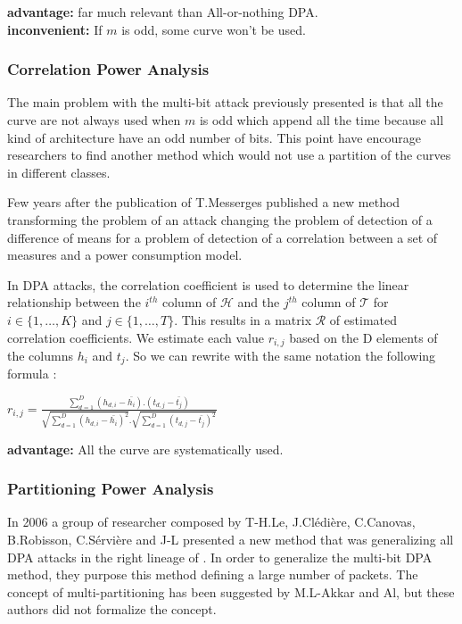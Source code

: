 \textbf{advantage:} far much relevant than All-or-nothing DPA.\\
\textbf{inconvenient:} If $m$ is odd, some curve won't be used.



\subsubsection{Correlation Power Analysis}
 The main problem with the multi-bit attack previously presented is that all the
curve are not always used when  $m$ is odd which append all the time because all kind of
architecture have an odd number of bits. This point have encourage researchers to find another 
method which would not use a partition of the curves in different classes.

Few years after the publication of  T.Messerges \cite{phd-Messerges-2000} 
published a new method transforming the problem of an attack changing
the problem of detection of a difference of means for a problem of detection 
of a correlation between a set of measures and  a power consumption model.


In DPA attacks, the correlation coefficient is used to determine the linear relationship between
the $i^{th}$ column of $\mathcal{H}$ and the $j^{th}$ column of $\mathcal{T}$ for $i \in\{ 1, \ldots,K \}$
and $j \in\{ 1, \ldots,T \}$. This results in a matrix $\mathcal{R}$ of estimated correlation coefficients.
We estimate each value $r_{i,j}$ based on the D elements of the columns $h_{i}$ and $t_{j}$. So we can
rewrite with the same notation the following formula :
\begin{center}
$r_{i,j} = \frac{\sum_{d=1}^{D}(h_{d,i}-\bar{h_{i}}) . (t_{d,j}-\bar{t_{j}})}{\sqrt{\sum_{d=1}^{D
}(h_{d,i}-\bar{h_{i}})^2} . \sqrt{\sum_{d=1}^{D}(t_{d,j}-\bar{t_{j}})^2}}$
\end{center}


\textbf{advantage:} All the curve are systematically used. 





\subsubsection{Partitioning Power Analysis}

In 2006 a group of researcher composed by T-H.Le, J.Cl\'edi\`ere, C.Canovas,
 B.Robisson, C.S\'ervi\`ere and J-L  presented a new method that 
was generalizing all DPA attacks in the right lineage of \cite{crypto-1999-kocher}.
In order to generalize the multi-bit DPA method, they purpose 
this method defining a large number of packets. 
The concept of multi-partitioning has been suggested by M.L-Akkar and Al, but
these authors did not formalize the concept.

